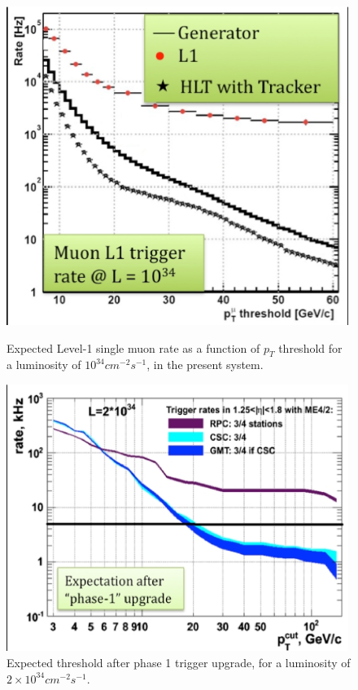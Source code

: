 \begin{figure}[ht!]
\begin{minipage}[t]{7.5cm}
\centering
\includegraphics[width=0.99\textwidth]{Plots/CurrentTracker.eps}
\caption{Expected Level-1 single muon rate as a function of $p_{T}$ threshold for a luminosity of $10^{34}cm^{-2}s^{-1}$, in the present system.~\cite{bib:Abb-11}}
\label{fig:L1Rates}
\end{minipage}
\hfill
\begin{minipage}[t]{7.5cm}
\centering
\includegraphics[width=0.99\textwidth]{Plots/21034_tracker.eps}
\caption{Expected threshold after phase 1 trigger upgrade, for a luminosity of $2\times 10^{34}cm^{-2}s^{-1}$.~\cite{bib:Abb-11}}
\label{fig:L1RatesPhase1}
\end{minipage}
\end{figure} 

